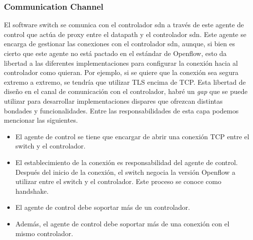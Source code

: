 \subsubsection{Communication Channel}

El software switch se comunica con el controlador \gls{sdn} a través de este agente de control que actúa de proxy entre el datapath y el controlador \gls{sdn}. Este agente se encarga de gestionar las conexiones con el controlador \gls{sdn}, aunque, si bien es cierto que este agente no está pactado en el estándar de Openflow, esto da libertad a las diferentes implementaciones para configurar la conexión hacia al controlador como quieran. Por ejemplo, si se quiere que la conexión sea segura extremo a extremo, se tendría que utilizar TLS encima de TCP. Esta libertad de diseño en el canal de comunicación con el controlador, habré un \textit{gap} que se puede utilizar para desarrollar implementaciones dispares que ofrezcan distintas bondades y funcionalidades. Entre las responsabilidades de esta capa podemos mencionar las siguientes.

\begin{itemize}
    \item El agente de control se tiene que encargar de abrir una conexión TCP entre el switch y el controlador.
    \item El establecimiento de la conexión es responsabilidad del agente de control. Después del inicio de la conexión, el switch negocia la versión Openflow a utilizar entre el switch y el controlador. Este proceso se conoce como handshake.
    \item El agente de control debe soportar más de un controlador.
    \item Además, el agente de control debe soportar más de una conexión con el mismo controlador.
\end{itemize}